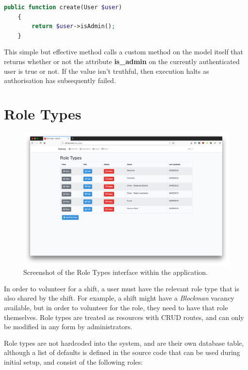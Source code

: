 \begin{lstlisting}[language=PHP, breaklines]
    public function create(User $user)
    {
        return $user->isAdmin();
    }
\end{lstlisting}

This simple but effective method calls a custom method on the model itself that returns whether or not the attribute \textbf{is\_admin} on the currently authenticated user is true or not. If the value isn't truthful, then execution halts as authorisation has subsequently failed.

\section{Role Types}

\begin{figure}[!ht]
    \centering
    \includegraphics[width=1.0\textwidth]{Figures/screenshot-roletypes}
    \caption{Screenshot of the Role Types interface within the application.}
    \label{fig:roletypes}
\end{figure}

In order to volunteer for a shift, a user must have the relevant role type that is also shared by the shift. For example, a shift might have a \textit{Blockman} vacancy available, but in order to volunteer for the role, they need to have that role themselves. Role types are treated as resources with CRUD routes, and can only be modified in any form by administrators.

Role types are not hardcoded into the system, and are their own database table, although a list of defaults is defined in the source code that can be used during initial setup, and consist of the following roles: 

